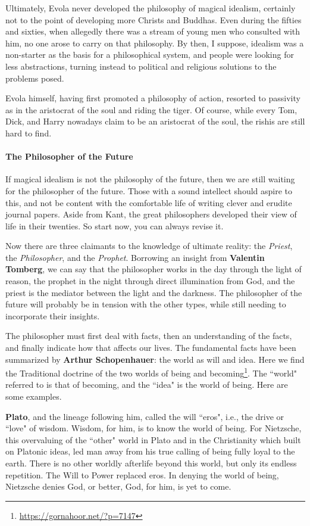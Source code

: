 Ultimately, Evola never developed the philosophy of magical idealism, certainly not to the point of developing more Christs and Buddhas. Even during the fifties and sixties, when allegedly there was a stream of young men who consulted with him, no one arose to carry on that philosophy. By then, I suppose, idealism was a non-starter as the basis for a philosophical system, and people were looking for less abstractions, turning instead to political and religious solutions to the problems posed.

Evola himself, having first promoted a philosophy of action, resorted to passivity as in the aristocrat of the soul and riding the tiger. Of course, while every Tom, Dick, and Harry nowadays claim to be an aristocrat of the soul, the rishis are still hard to find.

\paragraph{The Philosopher of the Future}
If magical idealism is not the philosophy of the future, then we are still waiting for the philosopher of the future. Those with a sound intellect should aspire to this, and not be content with the comfortable life of writing clever and erudite journal papers. Aside from Kant, the great philosophers developed their view of life in their twenties. So start now, you can always revise it.

Now there are three claimants to the knowledge of ultimate reality: the \emph{Priest}, the \emph{Philosopher}, and the \emph{Prophet}. Borrowing an insight from \textbf{Valentin Tomberg}, we can say that the philosopher works in the day through the light of reason, the prophet in the night through direct illumination from God, and the priest is the mediator between the light and the darkness. The philosopher of the future will probably be in tension with the other types, while still needing to incorporate their insights.

The philosopher must first deal with facts, then an understanding of the facts, and finally indicate how that affects our lives. The fundamental facts have been summarized by \textbf{Arthur Schopenhauer}: the world as will and idea. Here we find the Traditional doctrine of the two worlds of being and becoming\footnote{\url{https://gornahoor.net/?p=7147}}. The ``world" referred to is that of becoming, and the ``idea" is the world of being. Here are some examples.

\textbf{Plato}, and the lineage following him, called the will ``eros", i.e., the drive or ``love" of wisdom. Wisdom, for him, is to know the world of being. For Nietzsche, this overvaluing of the ``other" world in Plato and in the Christianity which built on Platonic ideas, led man away from his true calling of being fully loyal to the earth. There is no other worldly afterlife beyond this world, but only its endless repetition. The Will to Power replaced eros. In denying the world of being, Nietzsche denies God, or better, God, for him, is yet to come.

